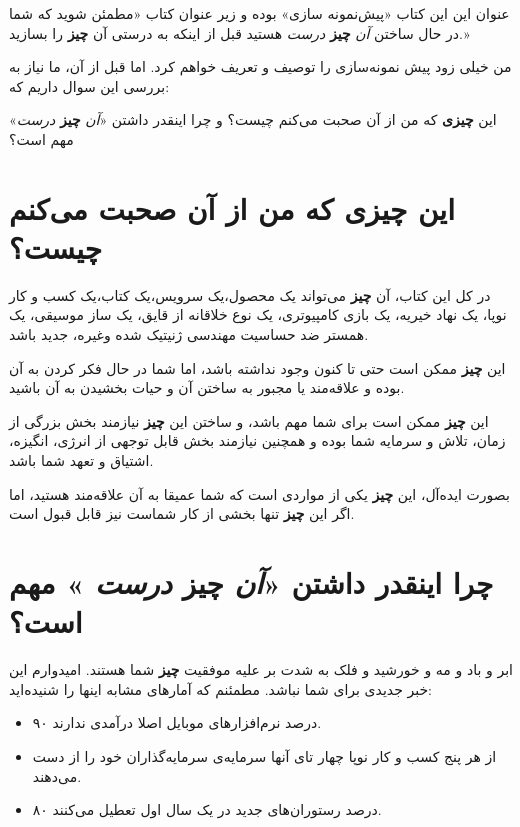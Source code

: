 عنوان این این کتاب «پیش‌نمونه سازی» بوده و زیر عنوان کتاب «مطمئن شوید که
شما در حال ساختن \emph{آن} \textbf{چیز} \emph{درست} هستید قبل از اینکه
به درستی آن \textbf{چیز} را بسازید.»

من خیلی زود پیش نمونه‌سازی را توصیف و تعریف خواهم کرد. اما قبل از آن، ما
نیاز به بررسی این سوال داریم که:

این \textbf{چیزی} که من از آن صحبت می‌کنم چیست؟ و چرا اینقدر داشتن
«\emph{آن} \textbf{چیز} \emph{درست}» مهم است؟

\section{\texorpdfstring{این \textbf{چیزی} که من از آن صحبت می‌کنم
چیست؟}{این چیزی که من از آن صحبت می‌کنم چیست؟}}\label{ux627ux6ccux646-ux686ux6ccux632ux6cc-ux6a9ux647-ux645ux646-ux627ux632-ux622ux646-ux635ux62dux628ux62a-ux645ux6ccux6a9ux646ux645-ux686ux6ccux633ux62a}

در کل این کتاب، آن \textbf{چیز} می‌تواند یک محصول،یک سرویس،یک کتاب،یک
کسب و کار نوپا، یک نهاد خیریه، یک بازی کامپیوتری، یک نوع خلاقانه از
قایق، یک ساز موسیقی، یک همستر ضد حساسیت مهندسی ژنیتیک شده وغیره، جدید
باشد.

این \textbf{چیز} ممکن است حتی تا کنون وجود نداشته باشد، اما شما در حال
فکر کردن به آن بوده و علاقه‌مند یا مجبور به ساختن آن و حیات بخشیدن به آن
باشید.

این \textbf{چیز} ممکن است برای شما مهم باشد، و ساختن این \textbf{چیز}
نیازمند بخش بزرگی از زمان، تلاش و سرمایه شما بوده و همچنین نیازمند بخش
قابل توجهی از انرژی، انگیزه، اشتیاق و تعهد شما باشد.

بصورت ایده‌آل، این \textbf{چیز} یکی از مواردی است که شما عمیقا به آن
علاقه‌مند هستید، اما اگر این \textbf{چیز} تنها بخشی از کار شماست نیز
قابل قبول است.

\section{\texorpdfstring{چرا اینقدر داشتن «\emph{آن} \textbf{چیز}
\emph{درست} » مهم
است؟}{چرا اینقدر داشتن «آن چیز درست » مهم است؟}}\label{ux686ux631ux627-ux627ux6ccux646ux642ux62fux631-ux62fux627ux634ux62aux646-ux622ux646-ux686ux6ccux632-ux62fux631ux633ux62a-ux645ux647ux645-ux627ux633ux62a}

ابر و باد و مه و خورشید و فلک به شدت بر علیه موفقیت \textbf{چیز} شما
هستند. امیدوارم این خبر جدیدی برای شما نباشد. مطمئنم که آمارهای مشابه
اینها را شنیده‌اید:

\begin{itemize}

\item
  ۹۰ درصد نرم‌افزارهای موبایل اصلا درآمدی ندارند.
\item
  از هر پنج کسب و کار نوپا چهار تای آنها سرمایه‌ی سرمایه‌گذاران خود را
  از دست می‌دهند.
\item
  ۸۰ درصد رستوران‌های جدید در یک سال اول تعطیل می‌کنند.
\end{itemize}

